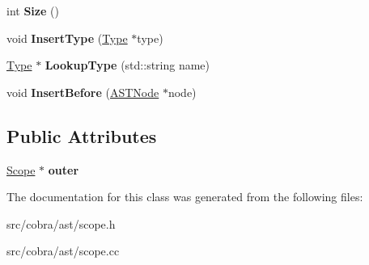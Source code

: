 \begin{DoxyCompactItemize}
\item 
\hypertarget{class_cobra_1_1internal_1_1_scope_a8e08e196bd7915f62fdc826ecd040c75}{int {\bfseries Size} ()}\label{class_cobra_1_1internal_1_1_scope_a8e08e196bd7915f62fdc826ecd040c75}

\item 
\hypertarget{class_cobra_1_1internal_1_1_scope_a012662aef4187026308ae1e23cd65024}{void {\bfseries Insert\+Type} (\hyperlink{class_cobra_1_1internal_1_1_type}{Type} $\ast$type)}\label{class_cobra_1_1internal_1_1_scope_a012662aef4187026308ae1e23cd65024}

\item 
\hypertarget{class_cobra_1_1internal_1_1_scope_ab9ccd81908f1b40ff9832e356412747f}{\hyperlink{class_cobra_1_1internal_1_1_type}{Type} $\ast$ {\bfseries Lookup\+Type} (std\+::string name)}\label{class_cobra_1_1internal_1_1_scope_ab9ccd81908f1b40ff9832e356412747f}

\item 
\hypertarget{class_cobra_1_1internal_1_1_scope_a34919fe65b37babd08d32855f7498193}{void {\bfseries Insert\+Before} (\hyperlink{class_cobra_1_1internal_1_1_a_s_t_node}{A\+S\+T\+Node} $\ast$node)}\label{class_cobra_1_1internal_1_1_scope_a34919fe65b37babd08d32855f7498193}

\end{DoxyCompactItemize}
\subsection*{Public Attributes}
\begin{DoxyCompactItemize}
\item 
\hypertarget{class_cobra_1_1internal_1_1_scope_adb3cfd7157d939009831473f4162e121}{\hyperlink{class_cobra_1_1internal_1_1_scope}{Scope} $\ast$ {\bfseries outer}}\label{class_cobra_1_1internal_1_1_scope_adb3cfd7157d939009831473f4162e121}

\end{DoxyCompactItemize}


The documentation for this class was generated from the following files\+:\begin{DoxyCompactItemize}
\item 
src/cobra/ast/scope.\+h\item 
src/cobra/ast/scope.\+cc\end{DoxyCompactItemize}
